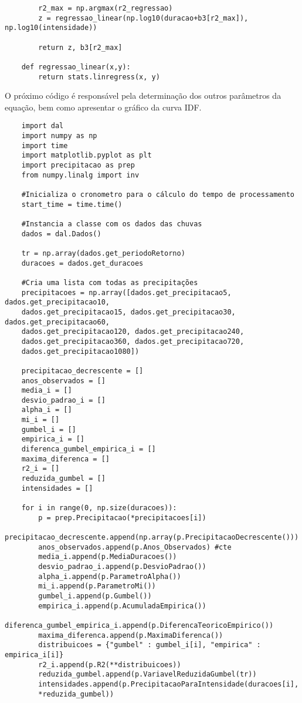 \begin{apendicesenv}
\begin{verbatim}
        r2_max = np.argmax(r2_regressao)
        z = regressao_linear(np.log10(duracao+b3[r2_max]), np.log10(intensidade))
    
        return z, b3[r2_max]
    
    def regressao_linear(x,y):
        return stats.linregress(x, y)
\end{verbatim}

O próximo código é responsável pela determinação dos outros parâmetros da equação, bem como apresentar o gráfico da curva IDF.

\begin{verbatim}
    import dal
    import numpy as np
    import time
    import matplotlib.pyplot as plt
    import precipitacao as prep
    from numpy.linalg import inv
    
    #Inicializa o cronometro para o cálculo do tempo de processamento
    start_time = time.time()
    
    #Instancia a classe com os dados das chuvas
    dados = dal.Dados()
    
    tr = np.array(dados.get_periodoRetorno)
    duracoes = dados.get_duracoes
    
    #Cria uma lista com todas as precipitações
    precipitacoes = np.array([dados.get_precipitacao5, dados.get_precipitacao10, 
    dados.get_precipitacao15, dados.get_precipitacao30, dados.get_precipitacao60, 
    dados.get_precipitacao120, dados.get_precipitacao240, 
    dados.get_precipitacao360, dados.get_precipitacao720, 
    dados.get_precipitacao1080])
    
    precipitacao_decrescente = []
    anos_observados = []
    media_i = []
    desvio_padrao_i = []
    alpha_i = []
    mi_i = []
    gumbel_i = []
    empirica_i = []
    diferenca_gumbel_empirica_i = []
    maxima_diferenca = []
    r2_i = []
    reduzida_gumbel = []
    intensidades = []
    
    for i in range(0, np.size(duracoes)):
        p = prep.Precipitacao(*precipitacoes[i])
        precipitacao_decrescente.append(np.array(p.PrecipitacaoDecrescente()))
        anos_observados.append(p.Anos_Observados) #cte
        media_i.append(p.MediaDuracoes())
        desvio_padrao_i.append(p.DesvioPadrao())
        alpha_i.append(p.ParametroAlpha())
        mi_i.append(p.ParametroMi())
        gumbel_i.append(p.Gumbel())
        empirica_i.append(p.AcumuladaEmpirica()) 
        diferenca_gumbel_empirica_i.append(p.DiferencaTeoricoEmpirico())
        maxima_diferenca.append(p.MaximaDiferenca())
        distribuicoes = {"gumbel" : gumbel_i[i], "empirica" : empirica_i[i]}
        r2_i.append(p.R2(**distribuicoes))
        reduzida_gumbel.append(p.VariavelReduzidaGumbel(tr))
        intensidades.append(p.PrecipitacaoParaIntensidade(duracoes[i], 
        *reduzida_gumbel))
    

\end{verbatim}
\end{apendicesenv}
